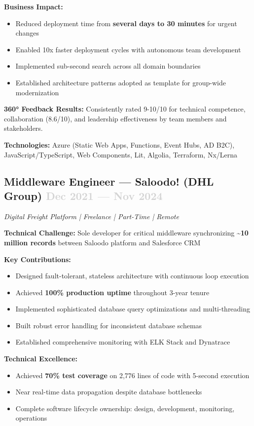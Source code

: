 \documentclass[11pt,a4paper]{article}
\begin{document}
\textbf{Business Impact:}
\begin{itemize}
    \item Reduced deployment time from \textbf{several days to 30 minutes} for urgent changes
    \item Enabled 10x faster deployment cycles with autonomous team development
    \item Implemented sub-second search across all domain boundaries
    \item Established architecture patterns adopted as template for group-wide modernization
\end{itemize}

\textbf{360° Feedback Results:} Consistently rated 9-10/10 for technical competence, collaboration (8.6/10), and leadership effectiveness by team members and stakeholders.

\textbf{Technologies:} Azure (Static Web Apps, Functions, Event Hubs, AD B2C), JavaScript/TypeScript, Web Components, Lit, Algolia, Terraform, Nx/Lerna

\subsection{Middleware Engineer — Saloodo! (DHL Group) \hfill \textcolor{lightgray}{Dec 2021 — Nov 2024}}
\textsl{Digital Freight Platform | Freelance | Part-Time | Remote}

\textbf{Technical Challenge:} Sole developer for critical middleware synchronizing \textbf{\textasciitilde{}10 million records} between Saloodo platform and Salesforce CRM

\textbf{Key Contributions:}
\begin{itemize}
    \item Designed fault-tolerant, stateless architecture with continuous loop execution
    \item Achieved \textbf{100\% production uptime} throughout 3-year tenure
    \item Implemented sophisticated database query optimizations and multi-threading
    \item Built robust error handling for inconsistent database schemas
    \item Established comprehensive monitoring with ELK Stack and Dynatrace
\end{itemize}

\textbf{Technical Excellence:}
\begin{itemize}
    \item Achieved \textbf{70\% test coverage} on 2,776 lines of code with 5-second execution
    \item Near real-time data propagation despite database bottlenecks
    \item Complete software lifecycle ownership: design, development, monitoring, operations
\end{itemize}
\end{document}
